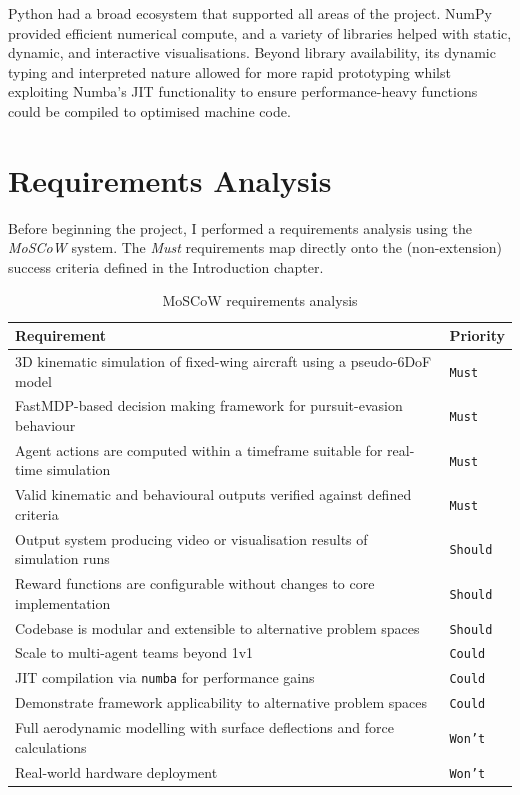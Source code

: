 Python had a broad ecosystem that supported all areas of the project. NumPy provided efficient numerical compute, and a variety of libraries helped with static, dynamic, and interactive visualisations. Beyond library availability, its dynamic typing and interpreted nature allowed for more rapid prototyping whilst exploiting Numba's JIT functionality to ensure performance-heavy functions could be compiled to optimised machine code.

\section{Requirements Analysis}
\label{sec:2.4}
Before beginning the project, I performed a requirements analysis using the \textit{MoSCoW} system. The \textit{Must} requirements map directly onto the (non-extension) success criteria defined in the Introduction chapter.

\begin{table}[H]
\centering
\renewcommand{\arraystretch}{1.2}
\begin{tabular}{p{}@{\hspace{1cm}}l}
\textbf{Requirement} & \textbf{Priority} \\
\midrule
3D kinematic simulation of fixed-wing aircraft using a pseudo-6DoF model & \colorbox{mustgreen}{\texttt{Must}} \\
FastMDP-based decision making framework for pursuit-evasion behaviour & \colorbox{mustgreen}{\texttt{Must}} \\
Agent actions are computed within a timeframe suitable for real-time simulation & \colorbox{mustgreen}{\texttt{Must}} \\
Valid kinematic and behavioural outputs verified against defined criteria & \colorbox{mustgreen}{\texttt{Must}} \\
\midrule
Output system producing video or visualisation results of simulation runs & \colorbox{shouldyellow}{\texttt{Should}} \\
Reward functions are configurable without changes to core implementation & \colorbox{shouldyellow}{\texttt{Should}} \\
Codebase is modular and extensible to alternative problem spaces & \colorbox{shouldyellow}{\texttt{Should}} \\
\midrule
Scale to multi-agent teams beyond 1v1 & \colorbox{couldorange}{\texttt{Could}} \\
JIT compilation via \texttt{numba} for performance gains & \colorbox{couldorange}{\texttt{Could}} \\
Demonstrate framework applicability to alternative problem spaces & \colorbox{couldorange}{\texttt{Could}} \\
\midrule
Full aerodynamic modelling with surface deflections and force calculations & \colorbox{wontred}{\texttt{Won't}} \\
Real-world hardware deployment & \colorbox{wontred}{\texttt{Won't}} \\
\end{tabular}
\caption{MoSCoW requirements analysis}
\label{tab:requirements}
\end{table}

